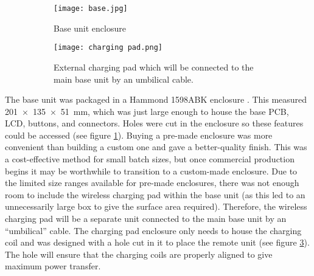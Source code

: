\begin{figure}[htb]
	\centering
	\begin{subfigure}[t]{0.4\linewidth}
		\texttt{[image: base.jpg]}
		\caption{Base unit enclosure}
		\label{fig: base enclosure}
	\end{subfigure}
	\begin{subfigure}[t]{0.4\linewidth}
		\texttt{[image: charging pad.png]}
		\caption{External charging pad which will be connected to the main base unit by an umbilical cable.}
		\label{fig: charging pad}
	\end{subfigure}
	\caption{}
\end{figure}

The base unit was packaged in a Hammond 1598ABK enclosure \cite{hammond}. This measured \SI{201x135x51}{\milli\metre}, which was just large enough to house the base PCB, LCD, buttons, and connectors. Holes were cut in the enclosure so these features could be accessed (see figure \ref{fig: base enclosure}). Buying a pre-made enclosure was more convenient than building a custom one and gave a better-quality finish. This was a cost-effective method for small batch sizes, but once commercial production begins it may be worthwhile to transition to a custom-made enclosure. Due to the limited size ranges available for pre-made enclosures, there was not enough room to include the wireless charging pad within the base unit (as this led to an unnecessarily large box to give the surface area required). Therefore, the wireless charging pad will be a separate unit connected to the main base unit by an ``umbilical'' cable. The charging pad enclosure only needs to house the charging coil and was designed with a hole cut in it to place the remote unit (see figure \ref{fig: charging pad}). The hole will ensure that the charging coils are properly aligned to give maximum power transfer.
